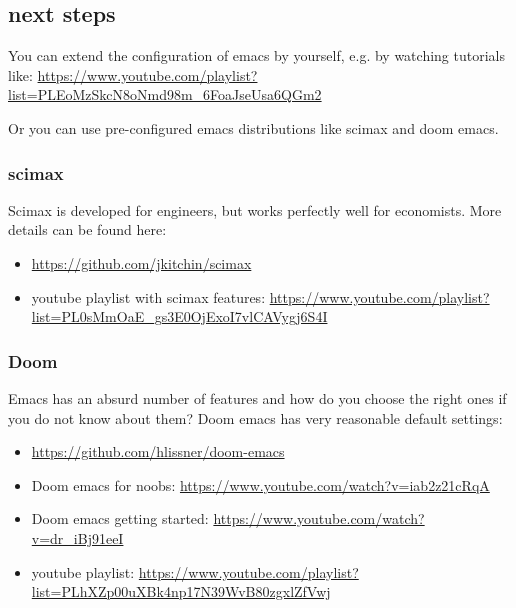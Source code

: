 \documentclass[11pt]{article}
\begin{document}
\subsection{next steps}
\label{sec:org5348c7c}

You can extend the configuration of emacs by yourself, e.g. by watching tutorials like: \url{https://www.youtube.com/playlist?list=PLEoMzSkcN8oNmd98m\_6FoaJseUsa6QGm2}

Or you can use pre-configured emacs distributions like scimax and doom emacs.


\subsubsection{scimax}
\label{sec:org50d8583}

Scimax is developed for engineers, but works perfectly well for economists. More details can be found here:
\begin{itemize}
\item \url{https://github.com/jkitchin/scimax}
\item youtube playlist with scimax features: \url{https://www.youtube.com/playlist?list=PL0sMmOaE\_gs3E0OjExoI7vlCAVygj6S4I}
\end{itemize}

\subsubsection{Doom}
\label{sec:org9677935}

Emacs has an absurd number of features and how do you choose the right ones if you do not know about them? Doom emacs has very reasonable default settings:
\begin{itemize}
\item \url{https://github.com/hlissner/doom-emacs}
\item Doom emacs for noobs: \url{https://www.youtube.com/watch?v=iab2z21cRqA}
\item Doom emacs getting started: \url{https://www.youtube.com/watch?v=dr\_iBj91eeI}
\item youtube playlist: \url{https://www.youtube.com/playlist?list=PLhXZp00uXBk4np17N39WvB80zgxlZfVwj}
\end{itemize}
\end{document}
